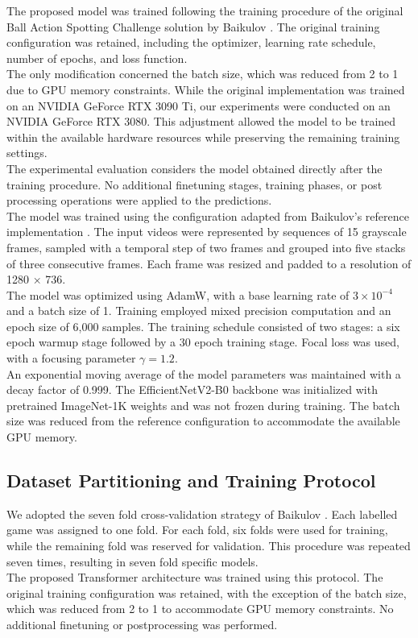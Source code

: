 \documentclass[conference]{IEEEtran}
\begin{document}
The proposed model was trained following the training procedure of the original Ball Action Spotting Challenge solution by Baikulov \cite{Baikulov2023}. The original training configuration was retained, including the optimizer, learning rate schedule, number of epochs, and loss function.\\
The only modification concerned the batch size, which was reduced from 2 to 1 due to GPU memory constraints. While the original implementation was trained on an NVIDIA GeForce RTX 3090 Ti, our experiments were conducted on an NVIDIA GeForce RTX 3080. This adjustment allowed the model to be trained within the available hardware resources while preserving the remaining training settings. \\
The experimental evaluation considers the model obtained directly after the training procedure. No additional finetuning stages, training phases, or post processing operations were applied to the predictions.\\
The model was trained using the configuration adapted from Baikulov's reference implementation \cite{Baikulov2023}. The input videos were represented by sequences of 15 grayscale frames, sampled with a temporal step of two frames and grouped into five stacks of three consecutive frames. Each frame was resized and padded to a resolution of 1280 × 736.\\
The model was optimized using AdamW, with a base learning rate of \(3 \times 10^{-4}\) and a batch size of 1. Training employed mixed precision computation and an epoch size of 6,000 samples. The training schedule consisted of two stages: a six epoch warmup stage followed by a 30 epoch training stage. Focal loss was used, with a focusing parameter \(\gamma=1.2\). \\
An exponential moving average of the model parameters was maintained with a decay factor of 0.999. The EfficientNetV2-B0 backbone was initialized with pretrained ImageNet-1K weights and was not frozen during training. The batch size was reduced from the reference configuration to accommodate the available GPU memory.

\subsection{Dataset Partitioning and Training Protocol}

We adopted the seven fold cross-validation strategy of Baikulov \cite{Baikulov2023}. Each labelled game was assigned to one fold. For each fold, six folds were used for training, while the remaining fold was reserved for validation. This procedure was repeated seven times, resulting in seven fold specific models.\\
The proposed Transformer architecture was trained using this protocol. The original training configuration was retained, with the exception of the batch size, which was reduced from 2 to 1 to accommodate GPU memory constraints. No additional finetuning or postprocessing was performed.
\end{document}
